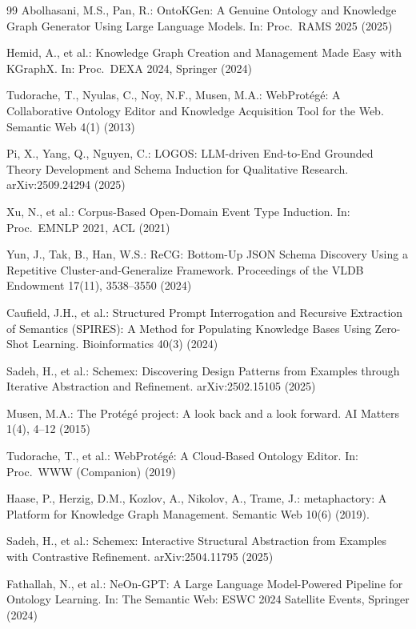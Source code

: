 \documentclass[runningheads,a4paper]{llncs}
\begin{document}
\begin{thebibliography}{99}
Abolhasani, M.S., Pan, R.:
OntoKGen: A Genuine Ontology and Knowledge Graph Generator Using Large
Language Models.
In: Proc.\ RAMS 2025 (2025)

Hemid, A., et al.:
Knowledge Graph Creation and Management Made Easy with KGraphX.
In: Proc.\ DEXA 2024, Springer (2024)

Tudorache, T., Nyulas, C., Noy, N.F., Musen, M.A.:
WebProt\'eg\'e: A Collaborative Ontology Editor and Knowledge Acquisition
Tool for the Web.
Semantic Web 4(1) (2013)

Pi, X., Yang, Q., Nguyen, C.:
LOGOS: LLM-driven End-to-End Grounded Theory Development and Schema
Induction for Qualitative Research.
arXiv:2509.24294 (2025)

Xu, N., et al.:
Corpus-Based Open-Domain Event Type Induction.
In: Proc.\ EMNLP 2021, ACL (2021)

Yun, J., Tak, B., Han, W.S.:
ReCG: Bottom-Up JSON Schema Discovery Using a Repetitive
Cluster-and-Generalize Framework.
Proceedings of the VLDB Endowment 17(11), 3538--3550 (2024)

Caufield, J.H., et al.:
Structured Prompt Interrogation and Recursive Extraction of Semantics
(SPIRES): A Method for Populating Knowledge Bases Using Zero-Shot
Learning.
Bioinformatics 40(3) (2024)

Sadeh, H., et al.:
Schemex: Discovering Design Patterns from Examples through Iterative
Abstraction and Refinement.
arXiv:2502.15105 (2025)

Musen, M.A.:
The Prot\'eg\'e project: A look back and a look forward.
AI Matters 1(4), 4--12 (2015)

Tudorache, T., et al.:
WebProt\'eg\'e: A Cloud-Based Ontology Editor.
In: Proc.\ WWW (Companion) (2019)

Haase, P., Herzig, D.M., Kozlov, A., Nikolov, A., Trame, J.:
metaphactory: A Platform for Knowledge Graph Management.
Semantic Web 10(6) (2019). 

Sadeh, H., et al.:
Schemex: Interactive Structural Abstraction from Examples with
Contrastive Refinement.
arXiv:2504.11795 (2025)

Fathallah, N., et al.:
NeOn-GPT: A Large Language Model-Powered Pipeline for Ontology Learning.
In: The Semantic Web: ESWC 2024 Satellite Events, Springer (2024)


\end{thebibliography}
\end{document}
